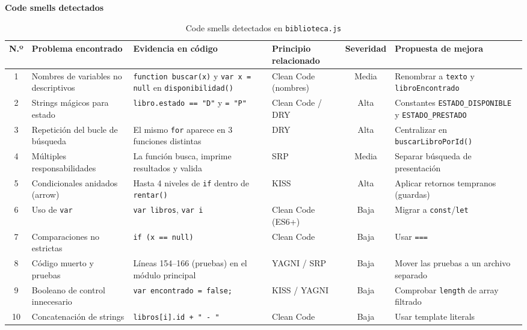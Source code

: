 \documentclass[12pt,letterpaper]{article}
\begin{document}
\begin{adjustwidth}{0.64cm}{0pt}
\vspace{8pt}
\textbf{Code smells detectados}
\vspace{4pt}
\begin{table}[H]
\scriptsize
\centering
\renewcommand{\arraystretch}{1.4}
\caption{Code smells detectados en \texttt{biblioteca.js}}
\label{tab:code-smells}
\begin{tabularx}{\linewidth}{|c|X|X|X|c|X|}
\hline
\textbf{N.º} & \textbf{Problema encontrado} & \textbf{Evidencia en código} & \textbf{Principio relacionado} & \textbf{Severidad} & \textbf{Propuesta de mejora} \\
\hline
1 & Nombres de variables no descriptivos & \texttt{function buscar(x)} y \texttt{var x = null} en \texttt{disponibilidad()} & Clean Code (nombres) & Media & Renombrar a \texttt{texto} y \texttt{libroEncontrado} \\
\hline
2 & Strings mágicos para estado & \texttt{libro.estado == "D"} y \texttt{= "P"} & Clean Code / DRY & Alta & Constantes \texttt{ESTADO\_DISPONIBLE} y \texttt{ESTADO\_PRESTADO} \\
\hline
3 & Repetición del bucle de búsqueda & El mismo \texttt{for} aparece en 3 funciones distintas & DRY & Alta & Centralizar en \texttt{buscarLibroPorId()} \\
\hline
4 & Múltiples responsabilidades & La función busca, imprime resultados y valida & SRP & Media & Separar búsqueda de presentación \\
\hline
5 & Condicionales anidados (arrow) & Hasta 4 niveles de \texttt{if} dentro de \texttt{rentar()} & KISS & Alta & Aplicar retornos tempranos (guardas) \\
\hline
6 & Uso de \texttt{var} & \texttt{var libros}, \texttt{var i} & Clean Code (ES6+) & Baja & Migrar a \texttt{const}/\texttt{let} \\
\hline
7 & Comparaciones no estrictas & \texttt{if (x == null)} & Clean Code & Baja & Usar \texttt{===} \\
\hline
8 & Código muerto y pruebas & Líneas 154--166 (pruebas) en el módulo principal & YAGNI / SRP & Baja & Mover las pruebas a un archivo separado \\
\hline
9 & Booleano de control innecesario & \texttt{var encontrado = false;} & KISS / YAGNI & Baja & Comprobar \texttt{length} de array filtrado \\
\hline
10 & Concatenación de strings & \texttt{libros[i].id + " - "} & Clean Code & Baja & Usar template literals \\
\hline
\end{tabularx}
\end{table}


\end{adjustwidth}
\end{document}
